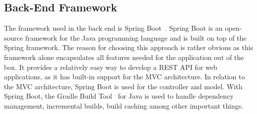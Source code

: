 \subsection{Back-End Framework}\label{subsec:back-end-framework}

The framework used in the back end is Spring Boot~\cite{springboot2024}.
Spring Boot is an open-source framework for the Java programming language and is built on top of the Spring framework.
The reason for choosing this approach is rather obvious as this framework alone encapsulates all features needed for the
application out of the box.
It provides a relatively easy way to develop a REST API for web applications, as it has built-in support for the MVC
architecture.
In relation to the MVC architecture, Spring Boot is used for the controller and model.
With Spring Boot, the Gradle Build Tool~\cite{gradle2024} for Java is used to handle dependency management, incremental
builds, build caching among other important things.
